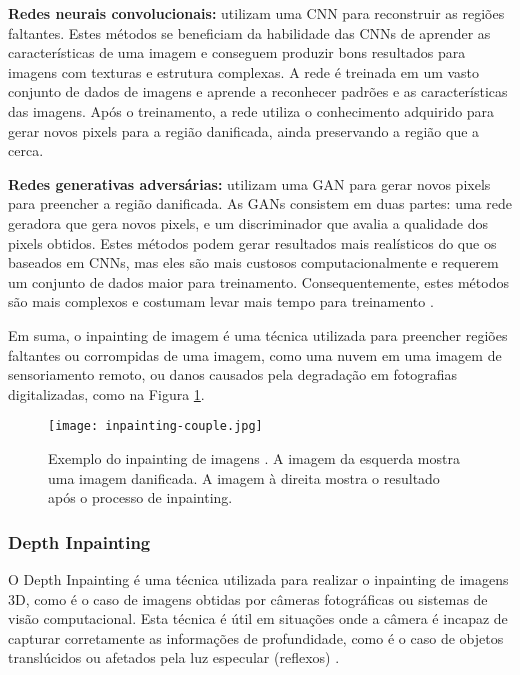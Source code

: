 \begin{list}{}{}
\item \textbf{Redes neurais convolucionais:} \label{cnn-based-learning}
utilizam uma CNN para reconstruir as regiões faltantes. Estes métodos se beneficiam da habilidade das CNNs de aprender as características de uma imagem e conseguem produzir bons resultados para imagens com texturas e estrutura complexas. A rede é treinada em um vasto conjunto de dados de imagens e aprende a reconhecer padrões e as características das imagens. Após o treinamento, a rede utiliza o conhecimento adquirido para gerar novos pixels para a região danificada, ainda preservando a região que a cerca.

\item \textbf{Redes generativas adversárias:} \label{gan-based-learning}
utilizam uma GAN para gerar novos pixels para preencher a região danificada. As GANs consistem em duas partes: uma rede geradora que gera novos pixels, e um discriminador que avalia a qualidade dos pixels obtidos\cite{black2020evaluation}. Estes métodos podem gerar resultados mais realísticos do que os baseados em CNNs, mas eles são mais custosos computacionalmente e requerem um conjunto de dados maior para treinamento. Consequentemente, estes métodos são mais complexos e costumam levar mais tempo para treinamento \cite{pathakCVPR16context}.

\end{list}
Em suma, o inpainting de imagem é uma técnica utilizada para preencher regiões faltantes ou corrompidas de uma imagem, como uma nuvem em uma imagem de sensoriamento remoto, ou danos causados pela degradação em fotografias digitalizadas, como na Figura \ref{fig:inpainting-couple}.

\begin{figure}[ht]
\centering
\texttt{[image: inpainting-couple.jpg]}
\caption{Exemplo do inpainting de imagens \cite{wiki:inpainting-couple}. A imagem da esquerda mostra uma imagem danificada. A imagem à direita mostra o resultado após o processo de inpainting.}
\label{fig:inpainting-couple}
\end{figure}


\subsubsection{Depth Inpainting} \label{quality-depth}
O Depth Inpainting é uma técnica utilizada para realizar o inpainting de imagens 3D, como é o caso de imagens obtidas por câmeras fotográficas ou sistemas de visão computacional. Esta técnica é útil em situações onde a câmera é incapaz de capturar corretamente as informações de profundidade, como é o caso de objetos translúcidos ou afetados pela luz especular (reflexos) \cite{shish20203dphoto}.

